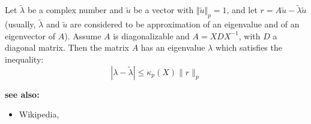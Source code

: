 \documentclass[12pt]{article}
\begin{document}
Let $\tilde{\lambda}$ be a complex number and $\tilde{u}$ be a vector with $ \Vert\tilde{u}\Vert _p = 1$, and let $r = A \tilde{u} - \tilde{\lambda} \tilde{u}$ (usually, $\tilde{\lambda}$ and $\tilde{u}$ are considered to be approximation of an eigenvalue and of an eigenvector of $A$).  Assume $A$ is diagonalizable and $A = XDX^{-1}$, with $D$ a diagonal matrix.  Then the matrix $A$ has an eigenvalue $\lambda$ which satisfies the inequality: 
\[
|\lambda - \tilde{\lambda}| \leq \kappa_p(X) \|r\|_p
\]

\textbf{see also:}
\begin{itemize}
\item Wikipedia, 
\end{itemize}

\end{document}

